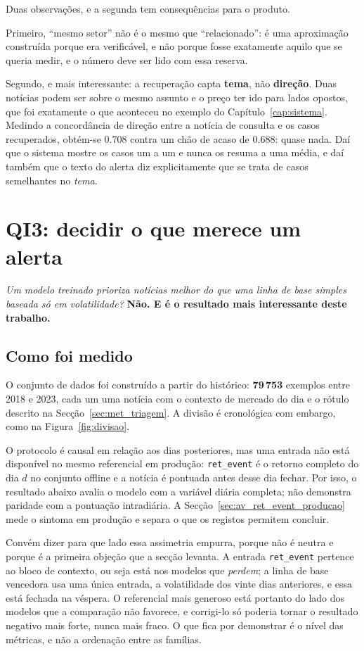 Duas observações, e a segunda tem consequências para o produto.

Primeiro, ``mesmo setor'' não é o mesmo que ``relacionado'': é uma aproximação construída porque era
verificável, e não porque fosse exatamente aquilo que se queria medir, e o número deve ser lido com
essa reserva.

Segundo, e mais interessante: a recuperação capta \textbf{tema}, não \textbf{direção}. Duas notícias
podem ser sobre o mesmo assunto e o preço ter ido para lados opostos, que foi exatamente o que
aconteceu no exemplo do Capítulo~\ref{cap:sistema}. Medindo a concordância de direção entre a
notícia de consulta e os casos recuperados, obtém-se $0.708$ contra um chão de acaso de $0.688$: quase
nada. Daí que o sistema mostre os casos um a um e nunca os resuma a uma média, e daí também que o texto do
alerta diz explicitamente que se trata de casos semelhantes no \emph{tema}.

\section{QI3: decidir o que merece um alerta}
\label{sec:av_qi3}

\emph{Um modelo treinado prioriza notícias melhor do que uma linha de base simples baseada só em
volatilidade?} \textbf{Não. E é o resultado mais interessante deste trabalho.}

\subsection{Como foi medido}

O conjunto de dados foi construído a partir do histórico: \textbf{79\,753} exemplos entre 2018 e
2023, cada um uma notícia com o contexto de mercado do dia e o rótulo descrito na
Secção~\ref{sec:met_triagem}. A divisão é cronológica com embargo, como na
Figura~\ref{fig:divisao}.

O protocolo é causal em relação aos dias posteriores, mas uma entrada não está disponível no mesmo
referencial em produção: \texttt{ret\_event} é o retorno completo do dia $d$ no conjunto offline e
a notícia é pontuada antes desse dia fechar. Por isso, o resultado abaixo avalia o modelo com a
variável diária completa; não demonstra paridade com a pontuação intradiária. A
Secção~\ref{sec:av_ret_event_producao} mede o sintoma em produção e separa o que os registos permitem
concluir.

Convém dizer para que lado essa assimetria empurra, porque não é neutra e porque é a primeira
objeção que a secção levanta. A entrada \texttt{ret\_event} pertence ao bloco de contexto, ou seja
está nos modelos que \emph{perdem}; a linha de base vencedora usa uma única entrada, a volatilidade
dos vinte dias anteriores, e essa está fechada na véspera. O referencial mais generoso está portanto
do lado dos modelos que a comparação não favorece, e corrigi-lo só poderia tornar o resultado
negativo mais forte, nunca mais fraco. O que fica por demonstrar é o nível das métricas, e não a
ordenação entre as famílias.

